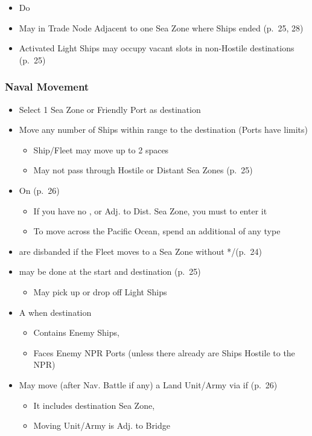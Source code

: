 \documentclass[10pt]{article}
\begin{document}
\begin{itemize}
	\item Do   
	\item May  in Trade Node Adjacent to one Sea Zone where Ships ended  (p.~25, 28)
	\item Activated Light Ships may occupy vacant  slots in non-Hostile destinations (p.~25)
\end{itemize}

\subsubsection*{Naval Movement}
\begin{itemize}
	\item Select 1 Sea Zone or Friendly Port as destination
	\item Move any number of Ships within range to the destination (Ports have limits)
	\begin{itemize}
		\item Ship/Fleet may move up to 2 spaces
		\item May not pass through Hostile or Distant Sea Zones (p.~25)
	\end{itemize}
	\item On  (p.~26)
	\begin{itemize}
		\item If you have no \claim, \town or \vassal Adj. to Dist. Sea Zone, you must  to enter it
		\item To move across the Pacific Ocean, spend an additional \monarchpower of any type
	\end{itemize}
	\item {} are disbanded if the Fleet moves to a Sea Zone without */\textdagger\xspace(p.~24)
	\item {} may be done at the start and destination (p.~25)
	\begin{itemize}
		\item May pick up or drop off Light Ships
	\end{itemize}
	\item A  when destination
	\begin{itemize}
		\item Contains Enemy Ships, 
		\item Faces Enemy NPR Ports (unless there already are Ships Hostile to the NPR)
	\end{itemize}
	\item {}May move (after Nav. Battle if any) a Land Unit/Army via  if (p.~26)
	\begin{itemize}
		\item It includes destination Sea Zone, 
		\item Moving Unit/Army is Adj. to Bridge
	\end{itemize}
\end{itemize}
\end{document}
